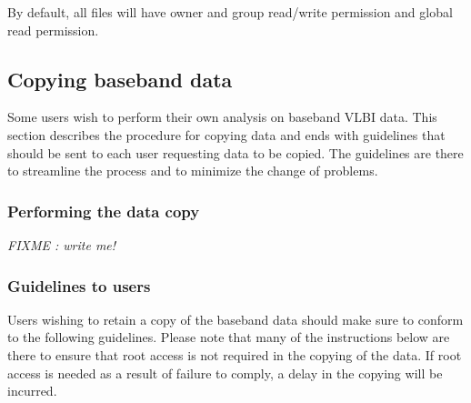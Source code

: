 By default, all files will have owner and group read/write permission and global read permission.

\subsection{Copying baseband data} \label{sec:datacopy}

Some users wish to perform their own analysis on baseband VLBI data.
This section describes the procedure for copying data and ends with guidelines that should be sent to each user requesting data to be copied.
The guidelines are there to streamline the process and to minimize the change of problems.

\subsubsection{Performing the data copy}

{\em FIXME : write me!}

\subsubsection{Guidelines to users}

Users wishing to retain a copy of the baseband data should make sure to
conform to the following guidelines.  Please note that many of the
instructions below are there to ensure that root access is not required in
the copying of the data.  If root access is needed as a result of failure to
comply, a delay in the copying will be incurred.

